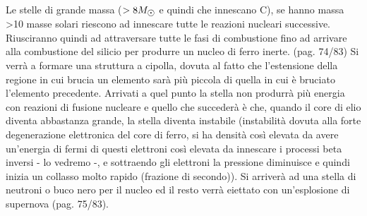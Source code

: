 Le stelle di grande massa ($>8\sunmass$ e quindi che innescano C), se hanno massa >10 masse solari riescono ad innescare tutte le reazioni nucleari successive. Riusciranno quindi ad attraversare tutte le fasi di combustione fino ad arrivare alla combustione del silicio per produrre un nucleo di ferro inerte. (pag. 74/83) Si verrà a formare una struttura a cipolla, dovuta al fatto che l'estensione della regione in cui brucia un elemento sarà più piccola di quella in cui è bruciato l'elemento precedente. Arrivati a quel punto la stella non produrrà più energia con reazioni di fusione nucleare e quello che succederà è che, quando il core di elio diventa abbastanza grande, la stella diventa instabile (instabilità dovuta alla forte degenerazione elettronica del core di ferro, si ha densità così elevata da avere un'energia di fermi di questi elettroni così elevata da innescare i processi beta inversi - lo vedremo -, e sottraendo gli elettroni la pressione diminuisce e quindi inizia un collasso molto rapido (frazione di secondo)). Si arriverà ad una stella di neutroni o buco nero per il nucleo ed il resto verrà eiettato con un'esplosione di supernova (pag. 75/83).